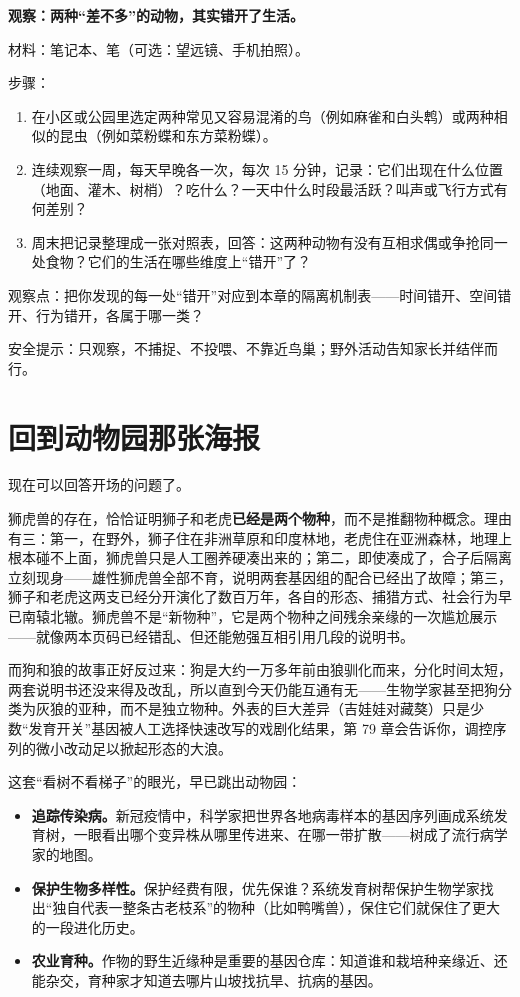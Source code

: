 \begin{shiyan}
\textbf{观察：两种“差不多”的动物，其实错开了生活。}

材料：笔记本、笔（可选：望远镜、手机拍照）。

步骤：
\begin{enumerate}[itemsep=1pt]
\item 在小区或公园里选定两种常见又容易混淆的鸟（例如麻雀和白头鹎）或两种相似的昆虫（例如菜粉蝶和东方菜粉蝶）。
\item 连续观察一周，每天早晚各一次，每次 15 分钟，记录：它们出现在什么位置（地面、灌木、树梢）？吃什么？一天中什么时段最活跃？叫声或飞行方式有何差别？
\item 周末把记录整理成一张对照表，回答：这两种动物有没有互相求偶或争抢同一处食物？它们的生活在哪些维度上“错开”了？
\end{enumerate}

观察点：把你发现的每一处“错开”对应到本章的隔离机制表——时间错开、空间错开、行为错开，各属于哪一类？

安全提示：只观察，不捕捉、不投喂、不靠近鸟巢；野外活动告知家长并结伴而行。
\end{shiyan}

\section{回到动物园那张海报}

现在可以回答开场的问题了。

狮虎兽的存在，恰恰证明狮子和老虎\textbf{已经是两个物种}，而不是推翻物种概念。理由有三：第一，在野外，狮子住在非洲草原和印度林地，老虎住在亚洲森林，地理上根本碰不上面，狮虎兽只是人工圈养硬凑出来的；第二，即使凑成了，合子后隔离立刻现身——雄性狮虎兽全部不育，说明两套基因组的配合已经出了故障；第三，狮子和老虎这两支已经分开演化了数百万年，各自的形态、捕猎方式、社会行为早已南辕北辙。狮虎兽不是“新物种”，它是两个物种之间残余亲缘的一次尴尬展示——就像两本页码已经错乱、但还能勉强互相引用几段的说明书。

而狗和狼的故事正好反过来：狗是大约一万多年前由狼驯化而来，分化时间太短，两套说明书还没来得及改乱，所以直到今天仍能互通有无——生物学家甚至把狗分类为灰狼的亚种，而不是独立物种。外表的巨大差异（吉娃娃对藏獒）只是少数“发育开关”基因被人工选择快速改写的戏剧化结果，第 79 章会告诉你，调控序列的微小改动足以掀起形态的大浪。

这套“看树不看梯子”的眼光，早已跳出动物园：

\begin{itemize}[itemsep=2pt]
\item \textbf{追踪传染病。}新冠疫情中，科学家把世界各地病毒样本的基因序列画成系统发育树，一眼看出哪个变异株从哪里传进来、在哪一带扩散——树成了流行病学家的地图。
\item \textbf{保护生物多样性。}保护经费有限，优先保谁？系统发育树帮保护生物学家找出“独自代表一整条古老枝系”的物种（比如鸭嘴兽），保住它们就保住了更大的一段进化历史。
\item \textbf{农业育种。}作物的野生近缘种是重要的基因仓库：知道谁和栽培种亲缘近、还能杂交，育种家才知道去哪片山坡找抗旱、抗病的基因。
\end{itemize}

